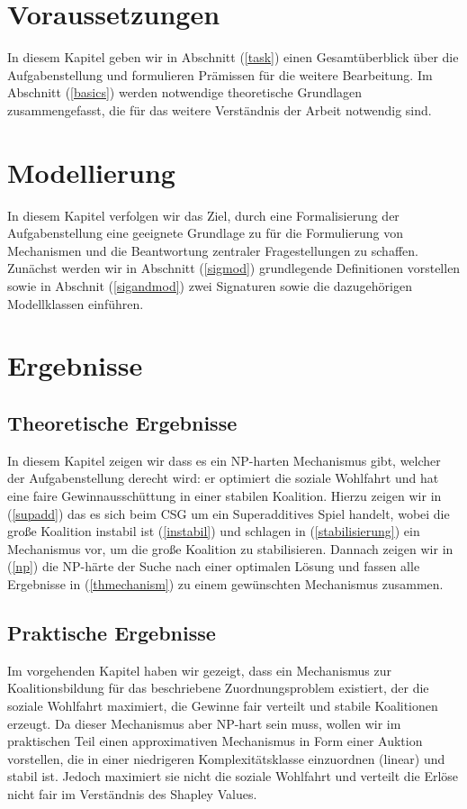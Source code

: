 \documentclass[sigconf]{acmart}
\theoremstyle{break}
\begin{document}
\section{Voraussetzungen}
\label{vorraus}
In diesem Kapitel geben wir in Abschnitt (\ref{task}) einen Gesamtüberblick über die Aufgabenstellung und formulieren Prämissen für die weitere Bearbeitung. Im Abschnitt (\ref{basics}) werden notwendige theoretische Grundlagen zusammengefasst, die für das weitere Verständnis der Arbeit notwendig sind.


\section{Modellierung}
\label{mod}
In diesem Kapitel verfolgen wir das Ziel, durch eine Formalisierung der Aufgabenstellung eine geeignete Grundlage zu für die Formulierung von Mechanismen und die Beantwortung zentraler Fragestellungen zu schaffen. Zunächst werden wir in Abschnitt (\ref{sigmod}) grundlegende Definitionen vorstellen sowie in Abschnit (\ref{sigandmod}) zwei Signaturen sowie die dazugehörigen Modellklassen einführen.



\section{Ergebnisse}
\label{ergebnisse}
\subsection{Theoretische Ergebnisse}
In diesem Kapitel zeigen wir dass es ein NP-harten Mechanismus gibt, welcher der Aufgabenstellung derecht wird: er optimiert die soziale Wohlfahrt und hat eine faire Gewinnausschüttung in einer stabilen Koalition. Hierzu zeigen wir in (\ref{supadd}) das es sich beim CSG um ein Superadditives Spiel handelt, wobei die große Koalition instabil ist (\ref{instabil}) und schlagen in (\ref{stabilisierung}) ein Mechanismus vor, um die große Koalition zu stabilisieren. Dannach zeigen wir in (\ref{np}) die NP-härte der Suche nach einer optimalen Lösung und fassen alle Ergebnisse in (\ref{thmechanism}) zu einem gewünschten Mechanismus zusammen.



\subsection{Praktische Ergebnisse}
Im vorgehenden Kapitel haben wir gezeigt, dass ein Mechanismus zur Koalitionsbildung für das beschriebene Zuordnungsproblem existiert, der die soziale Wohlfahrt maximiert, die Gewinne fair verteilt und stabile Koalitionen erzeugt. Da dieser Mechanismus aber NP-hart sein muss, wollen wir im praktischen Teil einen approximativen Mechanismus in Form einer Auktion vorstellen, die in einer niedrigeren Komplexitätsklasse einzuordnen (linear) und stabil ist. Jedoch maximiert sie nicht die soziale Wohlfahrt und verteilt die Erlöse nicht fair im Verständnis des Shapley Values.
\end{document}
